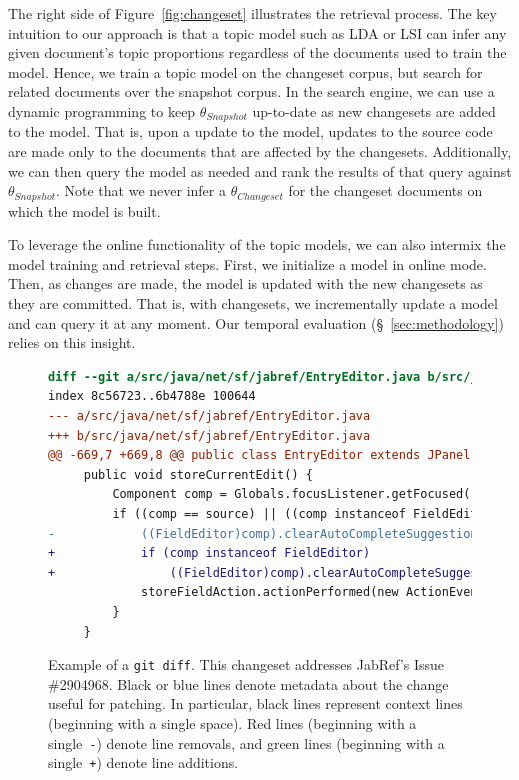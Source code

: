 The right side of Figure~\ref{fig:changeset} illustrates the retrieval process.
The key intuition to our approach is that a topic model such as LDA or LSI
can infer any given document's topic proportions regardless of the documents used to train the model.
Hence, we train a topic model on the changeset corpus,
but search for related documents over the snapshot corpus.
In the search engine, we can use a dynamic programming to
keep $\theta_{Snapshot}$ up-to-date as new changesets are added to the model.
That is, upon a update to the model, updates to the source code are made only to the documents that are affected by the changesets.
Additionally, we can then query the model as needed
and rank the results of that query against $\theta_{Snapshot}$.
Note that we never infer a $\theta_{Changeset}$
for the changeset documents on which the model is built.

To leverage the online functionality of the topic models,
we can also intermix the model training and retrieval steps.
First, we initialize a model in online mode.
Then, as changes are made, the model is updated with the new changesets as they are committed.
That is, with changesets, we incrementally update a model and can query it at any moment.
Our temporal evaluation (\S~\ref{sec:methodology}) relies on this insight.



\begin{figure}[t]
\centering
\footnotesize
\begin{lstlisting}[language=diff, basicstyle=\ttfamily]
diff --git a/src/java/net/sf/jabref/EntryEditor.java b/src/java/net/sf/jabref/EntryEditor.java
index 8c56723..6b4788e 100644
--- a/src/java/net/sf/jabref/EntryEditor.java
+++ b/src/java/net/sf/jabref/EntryEditor.java
@@ -669,7 +669,8 @@ public class EntryEditor extends JPanel implements VetoableChangeListener {
     public void storeCurrentEdit() {
         Component comp = Globals.focusListener.getFocused();
         if ((comp == source) || ((comp instanceof FieldEditor) && this.isAncestorOf(comp))) {
-            ((FieldEditor)comp).clearAutoCompleteSuggestion();
+            if (comp instanceof FieldEditor)
+                ((FieldEditor)comp).clearAutoCompleteSuggestion();
             storeFieldAction.actionPerformed(new ActionEvent(comp, 0, ""));
         }
     }
\end{lstlisting}
\caption{Example of a \texttt{git diff}.
This changeset addresses JabRef's Issue \#2904968.
Black or blue lines denote metadata about the change useful for patching.
In particular, black lines represent context lines (beginning with a single space).
Red lines (beginning with a single~\texttt{-}) denote line removals,
and green lines (beginning with a single~\texttt{+}) denote line additions.}
\label{fig:diff}
\vspace{-10pt}
\end{figure}
